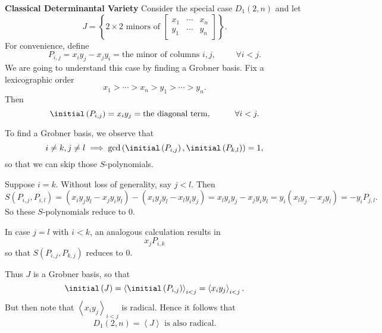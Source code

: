 \documentclass[co439]{subfiles}
\begin{document}
\begin{example}{\textbf{Classical Determinantal Variety}}
        Consider the special case $D_1\left( 2,n \right)$ and let
        \begin{equation*}
            J = \left\lbrace \text{$2\times 2$ minors of $\begin{bmatrix} x_1 & \cdots & x_n \\ y_1 & \cdots & y_n \end{bmatrix}$} \right\rbrace.
        \end{equation*}
        For convenience, define
        \begin{equation*}
            P_{i,j} = x_iy_j - x_jy_i = \text{the minor of columns $i,j$}, \hspace{1cm}\forall i<j.
        \end{equation*}
        We are going to understand this case by finding a Grobner basis. Fix a lexicographic order
        \begin{equation*}
            x_1 > \cdots > x_n > y_1 > \cdots > y_n.
        \end{equation*}
        Then
        \begin{equation*}
            \initial\left( P_{i,j} \right) = x_iy_j = \text{the diagonal term} ,\hspace{1cm}\forall i<j.
        \end{equation*}

        To find a Grobner basis, we observe that
        \begin{equation*}
            i\neq k, j\neq l \implies \gcd\left( \initial\left( P_{i,j} \right), \initial\left( P_{k,l} \right) \right) = 1,
        \end{equation*}
        so that we can skip those $S$-polynomials. 

        Suppose $i=k$. Without loss of generality, say $j<l$. Then
        \begin{equation*}
            S\left( P_{i,j},P_{i,l} \right) = \left( x_iy_jy_l - x_jy_iy_l \right) - \left( x_iy_jy_l-x_ly_iy_j \right) = x_ly_iy_j - x_jy_iy_l = y_i\left( x_ly_j - x_jy_l \right) = -y_iP_{j,l}.
        \end{equation*}
        So these $S$-polynomials reduce to $0$.

        In case $j=l$ with $i<k$, an analogous calculation results in
        \begin{equation*}
            x_jP_{i,k}
        \end{equation*}
        so that $S\left( P_{i,j},P_{k,j} \right)$ reduces to $0$.

        Thus $J$ is a Grobner basis, so that
        \begin{equation*}
            \initial\left( J \right) = \left< \initial\left( P_{i,j} \right) \right>_{i<j} = \left< x_iy_j \right>_{i<j}  .
        \end{equation*}
        But then note that $\left< x_iy_j \right>_{i<j}$ is radical. Hence it follows that
        \begin{equation*}
            \text{$D_1\left( 2,n \right) = \left< J \right>$ is also radical.}
        \end{equation*}
    \end{example}
\end{document}
